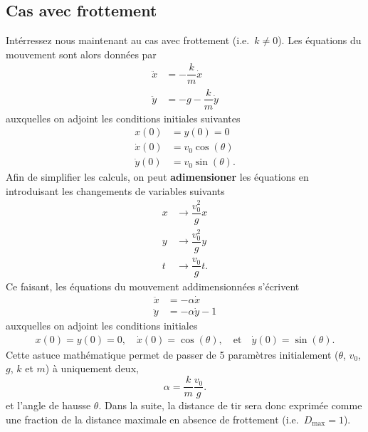 \documentclass[a4paper,12pt]{article} %
\begin{document}
\subsection*{Cas avec frottement}

Intérressez nous maintenant au cas avec frottement (i.e.\ $k \neq 0$).
Les équations du mouvement sont alors données par
%
\[
\begin{aligned}
  \ddot{x} & = -\dfrac{k}{m} \dot{x} \\
  \ddot{y} & = -g - \dfrac{k}{m} \dot{y}
\end{aligned}
\]
%
auxquelles on adjoint les conditions initiales suivantes
%
\[
\begin{aligned}
  x(0) & = y(0) = 0 \\
  \dot{x}(0) & = v_0 \cos(\theta) \\
  \dot{y}(0) & = v_0 \sin(\theta).
\end{aligned}
\]
%
Afin de simplifier les calculs, on peut \textbf{adimensioner} les équations en introduisant les changements de variables suivants
%
\[
\begin{aligned}
  x & \to \dfrac{v_0^2}{g} x \\
  y & \to \dfrac{v_0^2}{g} y \\
  t & \to \dfrac{v_0}{g}t.
\end{aligned}
\]
%
Ce faisant, les équations du mouvement addimensionnées s'écrivent
%
\[
\begin{aligned}
  \ddot{x} & = -\alpha \dot{x} \\
  \ddot{y} & = -\alpha \dot{y} - 1
\end{aligned}
\]
%
auxquelles on adjoint les conditions initiales
%
\[
\begin{aligned}
  x(0) = y(0) = 0, \quad \dot{x}(0) = \cos(\theta), \quad \text{et} \quad \dot{y}(0) = \sin(\theta).
\end{aligned}
\]
Cette astuce mathématique permet de passer de 5 paramètres initialement ($\theta$, $v_0$, $g$, $k$ et $m$) à uniquement deux, 
%
\[
\alpha = \dfrac{k}{m} \dfrac{v_0}{g}.
\]
%
et l'angle de hausse $\theta$.
Dans la suite, la distance de tir sera donc exprimée comme une fraction de la distance maximale en absence de frottement (i.e.\ $D_{\max} = 1$).
\end{document}
